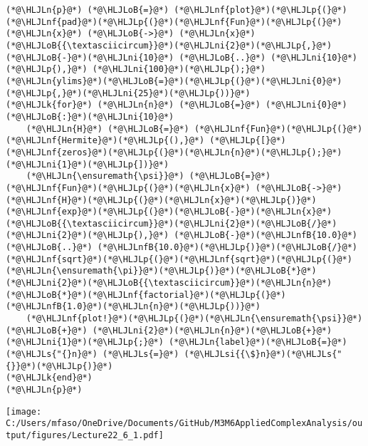 \documentclass[12pt,a4paper]{article}
\newcommand{\HLJLk}[1]{\textcolor[RGB]{148,91,176}{\textbf{#1}}}
\newcommand{\HLJLn}[1]{#1}
\newcommand{\HLJLnf}[1]{\textcolor[RGB]{66,102,213}{#1}}
\newcommand{\HLJLs}[1]{\textcolor[RGB]{201,61,57}{#1}}
\newcommand{\HLJLsi}[1]{#1}
\newcommand{\HLJLnfB}[1]{\textcolor[RGB]{59,151,46}{#1}}
\newcommand{\HLJLni}[1]{\textcolor[RGB]{59,151,46}{#1}}
\newcommand{\HLJLoB}[1]{\textcolor[RGB]{102,102,102}{\textbf{#1}}}
\newcommand{\HLJLp}[1]{#1}
\begin{document}
\begin{lstlisting}
(*@\HLJLn{p}@*) (*@\HLJLoB{=}@*) (*@\HLJLnf{plot}@*)(*@\HLJLp{(}@*)(*@\HLJLnf{pad}@*)(*@\HLJLp{(}@*)(*@\HLJLnf{Fun}@*)(*@\HLJLp{(}@*)(*@\HLJLn{x}@*) (*@\HLJLoB{->}@*) (*@\HLJLn{x}@*)(*@\HLJLoB{{\textasciicircum}}@*)(*@\HLJLni{2}@*)(*@\HLJLp{,}@*) (*@\HLJLoB{-}@*)(*@\HLJLni{10}@*) (*@\HLJLoB{..}@*) (*@\HLJLni{10}@*)(*@\HLJLp{),}@*) (*@\HLJLni{100}@*)(*@\HLJLp{);}@*) (*@\HLJLn{ylims}@*)(*@\HLJLoB{=}@*)(*@\HLJLp{(}@*)(*@\HLJLni{0}@*)(*@\HLJLp{,}@*)(*@\HLJLni{25}@*)(*@\HLJLp{))}@*)
(*@\HLJLk{for}@*) (*@\HLJLn{n}@*) (*@\HLJLoB{=}@*) (*@\HLJLni{0}@*)(*@\HLJLoB{:}@*)(*@\HLJLni{10}@*)
    (*@\HLJLn{H}@*) (*@\HLJLoB{=}@*) (*@\HLJLnf{Fun}@*)(*@\HLJLp{(}@*)(*@\HLJLnf{Hermite}@*)(*@\HLJLp{(),}@*) (*@\HLJLp{[}@*)(*@\HLJLnf{zeros}@*)(*@\HLJLp{(}@*)(*@\HLJLn{n}@*)(*@\HLJLp{);}@*)(*@\HLJLni{1}@*)(*@\HLJLp{])}@*)
    (*@\HLJLn{\ensuremath{\psi}}@*) (*@\HLJLoB{=}@*) (*@\HLJLnf{Fun}@*)(*@\HLJLp{(}@*)(*@\HLJLn{x}@*) (*@\HLJLoB{->}@*) (*@\HLJLnf{H}@*)(*@\HLJLp{(}@*)(*@\HLJLn{x}@*)(*@\HLJLp{)}@*)(*@\HLJLnf{exp}@*)(*@\HLJLp{(}@*)(*@\HLJLoB{-}@*)(*@\HLJLn{x}@*)(*@\HLJLoB{{\textasciicircum}}@*)(*@\HLJLni{2}@*)(*@\HLJLoB{/}@*)(*@\HLJLni{2}@*)(*@\HLJLp{),}@*) (*@\HLJLoB{-}@*)(*@\HLJLnfB{10.0}@*) (*@\HLJLoB{..}@*) (*@\HLJLnfB{10.0}@*)(*@\HLJLp{)}@*)(*@\HLJLoB{/}@*)(*@\HLJLnf{sqrt}@*)(*@\HLJLp{(}@*)(*@\HLJLnf{sqrt}@*)(*@\HLJLp{(}@*)(*@\HLJLn{\ensuremath{\pi}}@*)(*@\HLJLp{)}@*)(*@\HLJLoB{*}@*)(*@\HLJLni{2}@*)(*@\HLJLoB{{\textasciicircum}}@*)(*@\HLJLn{n}@*)(*@\HLJLoB{*}@*)(*@\HLJLnf{factorial}@*)(*@\HLJLp{(}@*)(*@\HLJLnfB{1.0}@*)(*@\HLJLn{n}@*)(*@\HLJLp{))}@*)
    (*@\HLJLnf{plot!}@*)(*@\HLJLp{(}@*)(*@\HLJLn{\ensuremath{\psi}}@*) (*@\HLJLoB{+}@*) (*@\HLJLni{2}@*)(*@\HLJLn{n}@*)(*@\HLJLoB{+}@*)(*@\HLJLni{1}@*)(*@\HLJLp{;}@*) (*@\HLJLn{label}@*)(*@\HLJLoB{=}@*)(*@\HLJLs{"{}n}@*) (*@\HLJLs{=}@*) (*@\HLJLsi{{\$}n}@*)(*@\HLJLs{"{}}@*)(*@\HLJLp{)}@*)
(*@\HLJLk{end}@*)
(*@\HLJLn{p}@*)
\end{lstlisting}

\texttt{[image: C:/Users/mfaso/OneDrive/Documents/GitHub/M3M6AppliedComplexAnalysis/output/figures/Lecture22\_6\_1.pdf]}
\end{document}

